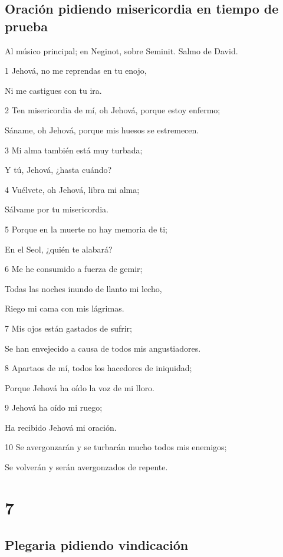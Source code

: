 \section*{Oración pidiendo misericordia en tiempo de prueba}

\par Al músico principal; en Neginot, sobre Seminit. Salmo de David.

\par 1 Jehová, no me reprendas en tu enojo,
\par Ni me castigues con tu ira.
\par 2 Ten misericordia de mí, oh Jehová, porque estoy enfermo;
\par Sáname, oh Jehová, porque mis huesos se estremecen.
\par 3 Mi alma también está muy turbada;
\par Y tú, Jehová, ¿hasta cuándo?
\par 4 Vuélvete, oh Jehová, libra mi alma;
\par Sálvame por tu misericordia.
\par 5 Porque en la muerte no hay memoria de ti;
\par En el Seol, ¿quién te alabará?
\par 6 Me he consumido a fuerza de gemir;
\par Todas las noches inundo de llanto mi lecho,
\par Riego mi cama con mis lágrimas.
\par 7 Mis ojos están gastados de sufrir;
\par Se han envejecido a causa de todos mis angustiadores.
\par 8 Apartaos de mí, todos los hacedores de iniquidad;
\par Porque Jehová ha oído la voz de mi lloro.
\par 9 Jehová ha oído mi ruego;
\par Ha recibido Jehová mi oración.
\par 10 Se avergonzarán y se turbarán mucho todos mis enemigos;
\par Se volverán y serán avergonzados de repente.

\chapter{7}

\section*{Plegaria pidiendo vindicación}

